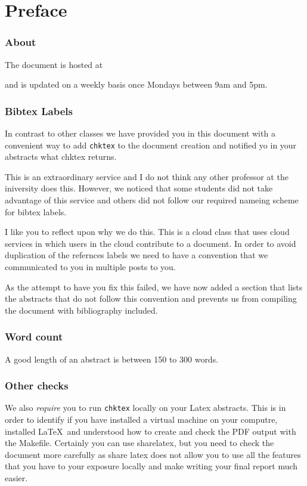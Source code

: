 \part{Preface}

\section{About}

The document is hosted at 


and is updated on a weekly basis once Mondays between 9am and 5pm.

\section{Bibtex Labels}

In contrast to other classes we have provided you in this document
with a convenient way to add \verb|chktex| to the document creation
and notified yo in your abstracts what chktex returns.


This is an extraordinary service and I do not think any other
professor at the iniversity does this. However, we noticed that some
students did not take advantage of this service and others did not
follow our required nameing scheme for bibtex labels.

I like you to reflect upon why we do this. This is a cloud class that
uses cloud services in which users in the cloud contribute to a
document. In order to avoid duplication of the refernces labels we
need to have a convention that we communicated to you in multiple
posts to you. 

As the attempt to have you fix this failed, we have now added a
section that lists the abstracts that do not follow this convention
and prevents us from compiling the document with bibliography
included.

\section{Word count}

A good length of an abstract is between 150 to 300 words.

\section{Other checks}

We also \textit{require} you to run \verb|chktex| locally on your
Latex abstracts. This is in order to identify if you have installed a
virtual machine on your computre, installed \LaTeX\ and understood how
to create and check the PDF output with the Makefile. Certainly you
can use sharelatex, but you need to check the document more carefully
as share latex does not allow you to use all the features that you
have to your exposure locally and make writing your final report much
easier. 


